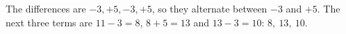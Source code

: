 The differences are $-3,+5,-3,+5$, so they alternate between $-3$ and $+5$. The next three terms are $11-3=8$, $8+5=13$ and $13-3=10$: $\boxed{8,\ 13,\ 10}$.
